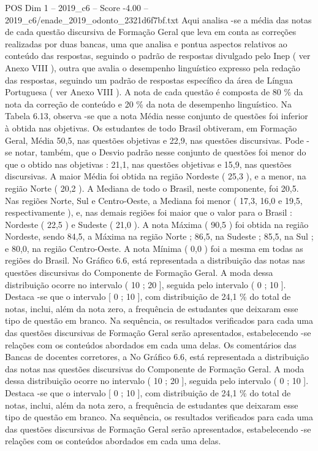 \begin{textsample}{POS Dim 1 – 2019\_c6 – Score -4.00 – 2019\_c6/enade\_2019\_odonto\_2321d6f7bf.txt}
Aqui analisa -se a média das notas de cada questão discursiva de Formação Geral que leva em conta as correções realizadas por duas bancas, uma que analisa e pontua aspectos relativos ao conteúdo das respostas, seguindo o padrão de respostas divulgado pelo Inep ( ver Anexo VIII ), outra que avalia o desempenho linguístico expresso pela redação das respostas, seguindo um padrão de respostas específico da área de Língua Portuguesa ( ver Anexo VIII ).
A nota de cada questão é composta de 80 \% da nota da correção de conteúdo e 20 \% da nota de desempenho linguístico.
Na Tabela 6.13, observa -se que a nota Média nesse conjunto de questões foi inferior à obtida nas objetivas.
Os estudantes de todo Brasil obtiveram, em Formação Geral, Média 50,5, nas questões objetivas e 22,9, nas questões discursivas.
Pode -se notar, também, que o Desvio padrão nesse conjunto de questões foi menor do que o obtido nas objetivas : 21,1, nas questões objetivas e 15,9, nas questões discursivas.
A maior Média foi obtida na região Nordeste ( 25,3 ), e a menor, na região Norte ( 20,2 ).
A Mediana de todo o Brasil, neste componente, foi 20,5.
Nas regiões Norte, Sul e Centro-Oeste, a Mediana foi menor ( 17,3, 16,0 e 19,5, respectivamente ), e, nas demais regiões foi maior que o valor para o Brasil : Nordeste ( 22,5 ) e Sudeste ( 21,0 ).
A nota Máxima ( 90,5 ) foi obtida na região Nordeste, sendo 84,5, a Máxima na região Norte ; 86,5, na Sudeste ; 85,5, na Sul ; e 80,0, na região Centro-Oeste.
A nota Mínima ( 0,0 ) foi a mesma em todas as regiões do Brasil.
No Gráfico 6.6, está representada a distribuição das notas nas questões discursivas do Componente de Formação Geral.
A moda dessa distribuição ocorre no intervalo ( 10 ; 20 ], seguida pelo intervalo ( 0 ; 10 ].
Destaca -se que o intervalo [ 0 ; 10 ], com distribuição de 24,1 \% do total de notas, inclui, além da nota zero, a frequência de estudantes que deixaram esse tipo de questão em branco.
Na sequência, os resultados verificados para cada uma das questões discursivas de Formação Geral serão apresentados, estabelecendo -se relações com os conteúdos abordados em cada uma delas.
Os comentários das Bancas de docentes corretores, a No Gráfico 6.6, está representada a distribuição das notas nas questões discursivas do Componente de Formação Geral.
A moda dessa distribuição ocorre no intervalo ( 10 ; 20 ], seguida pelo intervalo ( 0 ; 10 ].
Destaca -se que o intervalo [ 0 ; 10 ], com distribuição de 24,1 \% do total de notas, inclui, além da nota zero, a frequência de estudantes que deixaram esse tipo de questão em branco.
Na sequência, os resultados verificados para cada uma das questões discursivas de Formação Geral serão apresentados, estabelecendo -se relações com os conteúdos abordados em cada uma delas.

\end{textsample}
